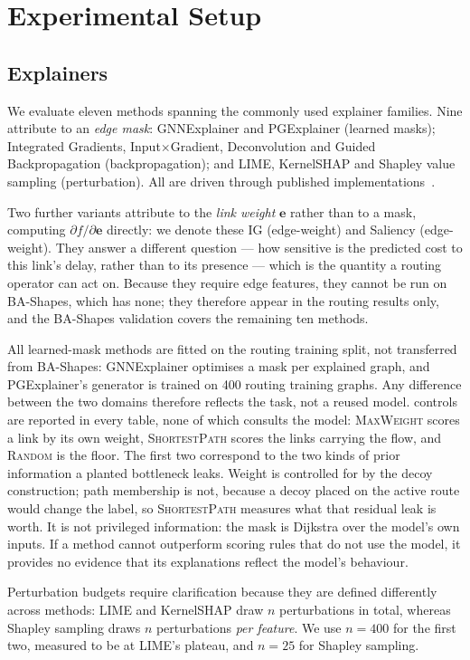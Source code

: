 \documentclass[conference]{IEEEtran}
\begin{document}
\section{Experimental Setup}
\label{sec:setup}
\subsection{Explainers}
We evaluate eleven methods spanning the commonly used explainer families.
Nine attribute to an \emph{edge mask}: GNNExplainer and PGExplainer (learned
masks); Integrated Gradients, Input$\times$Gradient, Deconvolution and Guided
Backpropagation (backpropagation); and LIME, KernelSHAP and Shapley value
sampling (perturbation). All are driven through published
implementations~\cite{fey2019pyg,kokhlikyan2020captum}.

Two further variants attribute to the \emph{link weight} $\mathbf{e}$ rather
than to a mask, computing $\partial f/\partial \mathbf{e}$ directly: we denote
these IG (edge-weight) and Saliency (edge-weight). They answer a different
question --- how sensitive is the predicted cost to this link's delay, rather
than to its presence --- which is the quantity a routing operator can act on.
Because they require edge features, they cannot be run on BA-Shapes, which has
none; they therefore appear in the routing results only, and the BA-Shapes
validation covers the remaining ten methods.

All learned-mask methods are fitted on the routing training split, not
transferred from BA-Shapes: GNNExplainer optimises a mask per explained graph,
and PGExplainer's generator is trained on 400 routing training graphs. Any
difference between the two domains therefore reflects the task, not a reused
model. \NControls{} controls are reported in every
table, none of which consults the model: \textsc{MaxWeight} scores a link by
its own weight, \textsc{ShortestPath} scores the links carrying the flow, and
\textsc{Random} is the floor. The first two correspond to the two kinds of
prior information a planted bottleneck leaks. Weight is controlled for by the
decoy construction; path membership is not, because a decoy placed on the
active route would change the label, so \textsc{ShortestPath} measures what
that residual leak is worth. It is not privileged information: the mask is
Dijkstra over the model's own inputs. If a method cannot outperform scoring rules that do not use the model, it provides no evidence that its explanations reflect the model's behaviour.

Perturbation budgets require clarification because they are defined differently across methods: LIME and KernelSHAP draw $n$ perturbations in total, whereas Shapley sampling draws $n$ perturbations \emph{per feature}. We use $n=400$ for the first two,
measured to be at LIME's plateau, and $n=25$ for Shapley sampling.
\end{document}
